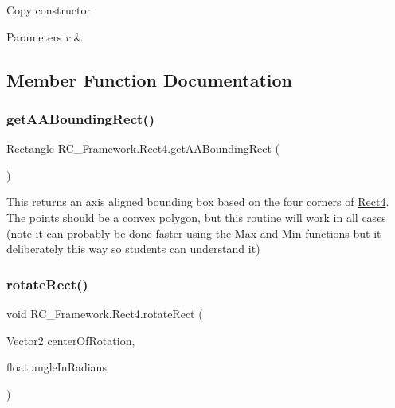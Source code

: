 Copy constructor 


\begin{DoxyParams}{Parameters}
{\em r} & \\
\hline
\end{DoxyParams}


\subsection{Member Function Documentation}
\mbox{\label{class_r_c___framework_1_1_rect4_a7b2896ea0757990f273214550111770d}} 
\subsubsection{\texorpdfstring{get\+A\+A\+Bounding\+Rect()}{getAABoundingRect()}}
{\footnotesize\ttfamily Rectangle R\+C\+\_\+\+Framework.\+Rect4.\+get\+A\+A\+Bounding\+Rect (\begin{DoxyParamCaption}{ }\end{DoxyParamCaption})}



This returns an axis aligned bounding box based on the four corners of \mbox{\hyperlink{class_r_c___framework_1_1_rect4}{Rect4}}. The points should be a convex polygon, but this routine will work in all cases (note it can probably be done faster using the Max and Min functions but it deliberately this way so students can understand it) 

\mbox{\label{class_r_c___framework_1_1_rect4_a49f1034230108e0d7f67e0e5c23d7571}} 
\subsubsection{\texorpdfstring{rotate\+Rect()}{rotateRect()}}
{\footnotesize\ttfamily void R\+C\+\_\+\+Framework.\+Rect4.\+rotate\+Rect (\begin{DoxyParamCaption}\item[{Vector2}]{center\+Of\+Rotation,  }\item[{float}]{angle\+In\+Radians }\end{DoxyParamCaption})}



